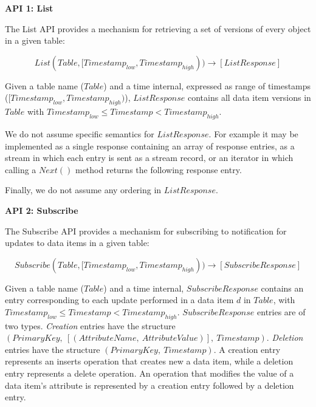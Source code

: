 \bigskip
\noindent
\textbf{API 1: List}

\noindent
The List API provides a mechanism for retrieving a set of versions of every object in a given table:

\[
  List(Table, [Timestamp_{low}, Timestamp_{high})) \rightarrow [ListResponse]
\]

\noindent
\begin{sloppypar}
Given a table name ($Table$) and a time internal, expressed as range of timestamps ($[Timestamp_{low}, Timestamp_{high})$),
$ListResponse$ contains all data item versions in $Table$ with $Timestamp_{low} \leq Timestamp < Timestamp_{high}$.
\end{sloppypar}

We do not assume specific semantics for $ListResponse$.
For example it may be implemented as a single response containing an array of response entries,
as a stream in which each entry is sent as a stream record,
or an iterator in which calling a $Next()$ method returns the following response entry.

Finally, we do not assume any ordering in $ListResponse$.



\bigskip

\noindent
\textbf{API 2: Subscribe}

\noindent
The Subscribe API provides a mechanism for subscribing to notification for updates to data items in a given table:

\[
  Subscribe(Table, [Timestamp_{low}, Timestamp_{high})) \rightarrow [SubscribeResponse]
\]

\noindent
\begin{sloppypar}
Given a table name ($Table$) and a time internal,
$SubscribeResponse$ contains an entry corresponding to each update performed in a data item $d$ in $Table$, with
$Timestamp_{low} \leq Timestamp < Timestamp_{high}$.
$SubscribeResponse$ entries are of two types.
\textit{Creation} entries have the structure $(PrimaryKey,~[(AttributeName,~AttributeValue)],~Timestamp)$.
\textit{Deletion} entries have the structure $(PrimaryKey,~Timestamp)$.
A creation entry represents an inserts operation that creates new a data item,
while a deletion entry represents a delete operation.
An operation that modifies the value of a data item's attribute is represented by a creation entry followed by a deletion
entry.
\end{sloppypar}

